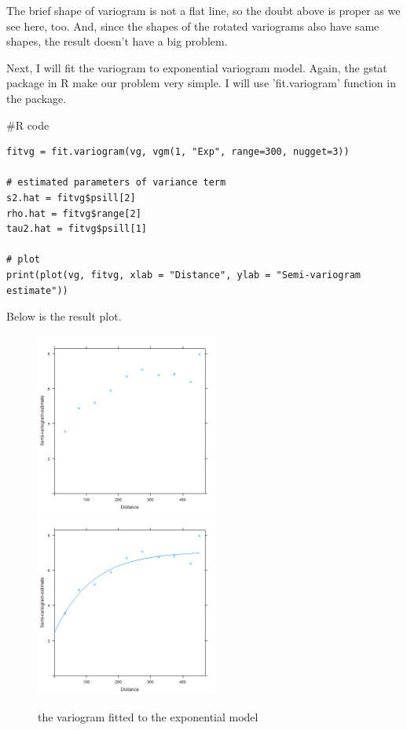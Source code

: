 \documentclass{article}
\newenvironment{Rcode}%
{%
    \begin{mdframed}
    \#R code
    \begin{small}
}
{%
    \end{small}
    \end{mdframed}
}
\begin{document}
The brief shape of variogram is not a flat line, so the doubt above is proper as we see here, too.
And, since the shapes of the rotated variograms also have same shapes, the result doesn't have a big problem.

Next, I will fit the variogram to exponential variogram model.
Again, the gstat package in R make our problem very simple. I will use 'fit.variogram' function in the package.

\begin{Rcode}
    \begin{verbatim}
fitvg = fit.variogram(vg, vgm(1, "Exp", range=300, nugget=3)) 

# estimated parameters of variance term
s2.hat = fitvg$psill[2]
rho.hat = fitvg$range[2]
tau2.hat = fitvg$psill[1]

# plot
print(plot(vg, fitvg, xlab = "Distance", ylab = "Semi-variogram estimate"))
    \end{verbatim}
\end{Rcode}

Below is the result plot.

\begin{figure}[!h]
    \centering
    \includegraphics[height=6cm]{prob2_CAtemp_variogram.png}
    \includegraphics[height=6cm]{prob2_CAtemp_variogram_exp_fit.png}
    \caption{the variogram fitted to the exponential model}
\end{figure}
\end{document}
